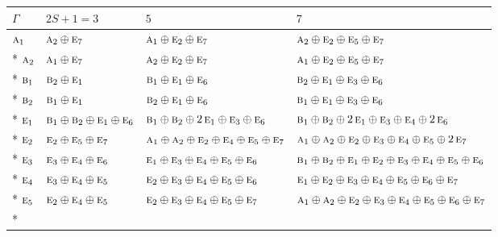 \documentclass[10pt,a4paper]{article}
\numberwithin{equation}{section}
\newcommand{\irr}[1]{\text{\normalfont\scshape #1}}
\begin{document}
{\small\setlength{\tabcolsep}{3pt}\begin{longtable}{@{}llll@{}}\toprule
$\Gamma$ & $2S + 1 = 3$ & $5$ & $7$\\\midrule\endhead
\bottomrule\endfoot\endlastfoot
$\irr{a}_{1}$ & $\irr{a}_{2}\oplus \irr{e}_{7}$ & $\irr{a}_{1}\oplus \irr{e}_{2}\oplus \irr{e}_{7}$ & $\irr{a}_{2}\oplus \irr{e}_{2}\oplus \irr{e}_{5}\oplus \irr{e}_{7}$\\*
$\irr{a}_{2}$ & $\irr{a}_{1}\oplus \irr{e}_{7}$ & $\irr{a}_{2}\oplus \irr{e}_{2}\oplus \irr{e}_{7}$ & $\irr{a}_{1}\oplus \irr{e}_{2}\oplus \irr{e}_{5}\oplus \irr{e}_{7}$\\*
$\irr{b}_{1}$ & $\irr{b}_{2}\oplus \irr{e}_{1}$ & $\irr{b}_{1}\oplus \irr{e}_{1}\oplus \irr{e}_{6}$ & $\irr{b}_{2}\oplus \irr{e}_{1}\oplus \irr{e}_{3}\oplus \irr{e}_{6}$\\*
$\irr{b}_{2}$ & $\irr{b}_{1}\oplus \irr{e}_{1}$ & $\irr{b}_{2}\oplus \irr{e}_{1}\oplus \irr{e}_{6}$ & $\irr{b}_{1}\oplus \irr{e}_{1}\oplus \irr{e}_{3}\oplus \irr{e}_{6}$\\*
$\irr{e}_{1}$ & $\irr{b}_{1}\oplus \irr{b}_{2}\oplus \irr{e}_{1}\oplus \irr{e}_{6}$ & $\irr{b}_{1}\oplus \irr{b}_{2}\oplus 2\,\irr{e}_{1}\oplus \irr{e}_{3}\oplus \irr{e}_{6}$ & $\irr{b}_{1}\oplus \irr{b}_{2}\oplus 2\,\irr{e}_{1}\oplus \irr{e}_{3}\oplus \irr{e}_{4}\oplus 2\,\irr{e}_{6}$\\*
$\irr{e}_{2}$ & $\irr{e}_{2}\oplus \irr{e}_{5}\oplus \irr{e}_{7}$ & $\irr{a}_{1}\oplus \irr{a}_{2}\oplus \irr{e}_{2}\oplus \irr{e}_{4}\oplus \irr{e}_{5}\oplus \irr{e}_{7}$ & $\irr{a}_{1}\oplus \irr{a}_{2}\oplus \irr{e}_{2}\oplus \irr{e}_{3}\oplus \irr{e}_{4}\oplus \irr{e}_{5}\oplus 2\,\irr{e}_{7}$\\*
$\irr{e}_{3}$ & $\irr{e}_{3}\oplus \irr{e}_{4}\oplus \irr{e}_{6}$ & $\irr{e}_{1}\oplus \irr{e}_{3}\oplus \irr{e}_{4}\oplus \irr{e}_{5}\oplus \irr{e}_{6}$ & $\irr{b}_{1}\oplus \irr{b}_{2}\oplus \irr{e}_{1}\oplus \irr{e}_{2}\oplus \irr{e}_{3}\oplus \irr{e}_{4}\oplus \irr{e}_{5}\oplus \irr{e}_{6}$\\*
$\irr{e}_{4}$ & $\irr{e}_{3}\oplus \irr{e}_{4}\oplus \irr{e}_{5}$ & $\irr{e}_{2}\oplus \irr{e}_{3}\oplus \irr{e}_{4}\oplus \irr{e}_{5}\oplus \irr{e}_{6}$ & $\irr{e}_{1}\oplus \irr{e}_{2}\oplus \irr{e}_{3}\oplus \irr{e}_{4}\oplus \irr{e}_{5}\oplus \irr{e}_{6}\oplus \irr{e}_{7}$\\*
$\irr{e}_{5}$ & $\irr{e}_{2}\oplus \irr{e}_{4}\oplus \irr{e}_{5}$ & $\irr{e}_{2}\oplus \irr{e}_{3}\oplus \irr{e}_{4}\oplus \irr{e}_{5}\oplus \irr{e}_{7}$ & $\irr{a}_{1}\oplus \irr{a}_{2}\oplus \irr{e}_{2}\oplus \irr{e}_{3}\oplus \irr{e}_{4}\oplus \irr{e}_{5}\oplus \irr{e}_{6}\oplus \irr{e}_{7}$\\*

\end{longtable}}
\end{document}
